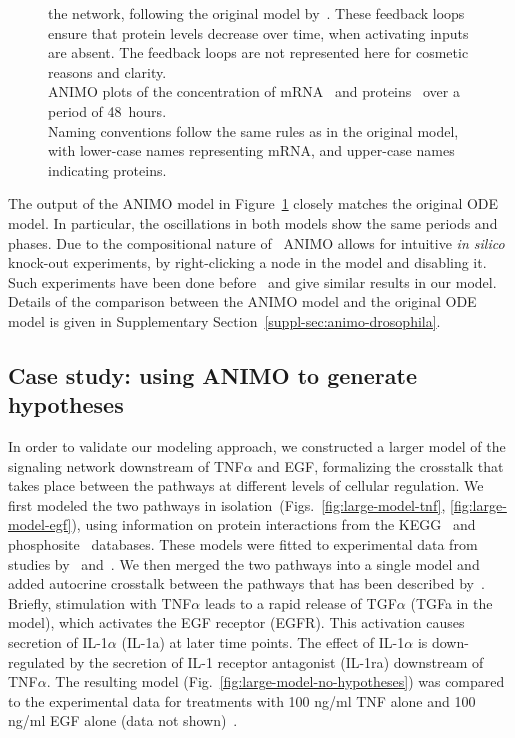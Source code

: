 \begin{figure}[!htpb]
{the network, following the original model by~\cite{drosophila-ode-model}. These feedback loops ensure that 
protein levels decrease over time, when activating inputs are absent. The feedback loops are not represented here 
for cosmetic reasons and clarity.\\%
ANIMO plots of the concentration of
mRNA~{\bfseries \protect{}}
and proteins~{\bfseries \protect{}} over a period of 48~hours.\\
Naming conventions follow the same rules
as in the original model, with lower-case names representing mRNA, and upper-case names indicating proteins.
}\label{fig:drosophila}
\end{figure}


The output of the ANIMO model in Figure~\ref{fig:drosophila} closely matches the original ODE model.
In particular, the oscillations in both models show the same periods and phases.
Due to the compositional nature of \tas\, ANIMO allows for intuitive \emph{in silico} knock-out experiments,
by right-clicking a node in the model and disabling it. Such experiments have been done 
before~\citep{drosophila-ode-model} and give similar results in our model. Details of the comparison
between the ANIMO model and the original ODE model is given in Supplementary Section~\ref{suppl-sec:animo-drosophila}.



\subsection{Case study: using ANIMO to generate hypotheses}\label{subsec:case-study-larger}
In order to validate our modeling approach,
we constructed a larger model of the signaling network downstream of TNF$\alpha$ and EGF, formalizing 
the crosstalk that takes place between the pathways at different levels of cellular regulation.
We first modeled the two pathways in isolation~(Figs.~\ref{fig:large-model-tnf}, \ref{fig:large-model-egf}),
using information on protein interactions from
the KEGG~\citep{kegg} and phosphosite~\citep{phosphosite} databases. These models were fitted to experimental data
from studies by~\citet{pathway-compendium} and~\citet{pathway-autocrine}.
We then merged the two pathways into a single model and added autocrine crosstalk between the pathways that has been
described by~\citet{pathway-autocrine}.
Briefly, stimulation with TNF$\alpha$ leads to a rapid release of TGF$\alpha$ ({\sf TGFa} in the model), 
which activates the EGF receptor ({\sf EGFR}).
This activation causes secretion of IL-1$\alpha$ ({\sf IL-1a}) at later time points.
The effect of IL-1$\alpha$ is down-regulated by the secretion of IL-1 receptor antagonist ({\sf IL-1ra}) 
downstream of TNF$\alpha$.
The resulting model (Fig.~\ref{fig:large-model-no-hypotheses}) was compared to the experimental data 
for treatments with 100 ng/ml TNF alone and 100 ng/ml EGF alone (data not shown)~\citep{pathway-compendium}.

